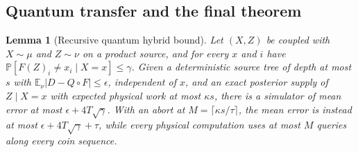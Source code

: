 \documentclass[11pt]{article}
\newtheorem{lemma}[theorem]{Lemma}
\theoremstyle{definition}\newtheorem{definition}[theorem]{Definition}
\theoremstyle{remark}\newtheorem{remark}[theorem]{Remark}
\newcommand{\E}{\mathbb E}\newcommand{\Prb}{\mathbb P}
\begin{document}
\subsection{Quantum transfer and the final theorem}
\begin{lemma}[Recursive quantum hybrid bound]\label{lem:hybrid}
Let \((X,Z)\) be coupled with \(X\sim\mu\) and \(Z\sim\nu\) on a product source, and for every \(x\) and \(i\) have \(\Prb[F(Z)_i\ne x_i\mid X=x]\le\gamma\). Given a deterministic source tree of depth at most \(s\) with \(\E_\nu|D-Q\circ F|\le\epsilon\), independent of \(x\), and an exact posterior supply of \(Z\mid X=x\) with expected physical work at most \(\kappa s\), there is a simulator of mean error at most \(\epsilon+4T\sqrt\gamma\). With an abort at \(M=\lceil\kappa s/\tau\rceil\), the mean error is instead at most \(\epsilon+4T\sqrt\gamma+\tau\), while every physical computation uses at most \(M\) queries along every coin sequence.
\end{lemma}
\end{document}
